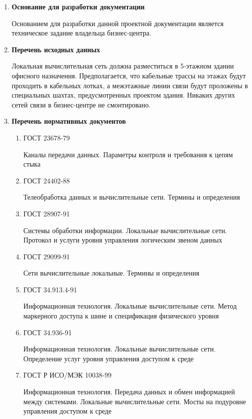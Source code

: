 \documentclass[a4paper,14pt]{extarticle}
\begin{document}
    \begin{enumerate}
        \item \textbf{Основание для разработки документации}\par
        Основанием для разработки данной проектной документации является техническое задание владельца бизнес-центра.
        \item \textbf{Перечень исходных данных}\par
        Локальная вычислительная сеть должна разместиться в 5-этажном здании офисного назначения. Предполагается, что 
        кабельные трассы на этажах будут проходить в кабельных лотках, а межэтажные линии связи будут проложены в специальных 
        шахтах, предусмотренных проектом здания. Никаких других сетей связи в бизнес-центре не смонтировано.
        \item \textbf{Перечень нормативных документов}\par
        \begin{enumerate}
            \item ГОСТ 23678-79\par
            Каналы передачи данных. Параметры контроля и требования к цепям стыка
            \item ГОСТ 24402-88\par
            Телеобработка данных и вычислительные сети. Термины и определения
            \item ГОСТ 28907-91\par
            Системы обработки информации. Локальные вычислительные сети. Протокол и услуги уровня управления логическим звеном данных
            \item ГОСТ 29099-91\par
            Сети вычислительные локальные. Термины и определения
            \item ГОСТ 34.913.4-91\par
            Информационная технология. Локальные вычислительные сети. Метод маркерного доступа к шине и спецификация физического уровня
            \item ГОСТ 34.936-91\par
            Информационная технология. Локальные вычислительные сети. Определение услуг уровня управления доступом к среде
            \item ГОСТ Р ИСО/МЭК 10038-99\par
            Информационная технология. Передача данных и обмен информацией между системами. Локальные вычислительные сети. Мосты на подуровне управления доступом к среде

\end{enumerate}
\end{enumerate}
\end{document}
